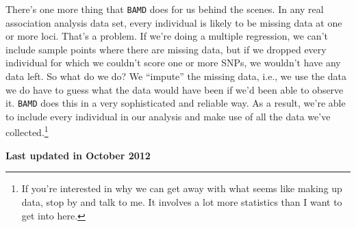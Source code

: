 There's one more thing that {\tt BAMD} does for us behind the
scenes. In any real association analysis data set, every individual is
likely to be missing data at one or more loci. That's a problem. If
we're doing a multiple regression, we can't include sample points
where there are missing data, but if we dropped every individual for
which we couldn't score one or more SNPs, we wouldn't have any data
left. So what do we do? We ``impute'' the missing data, i.e., we use
the data we do have to guess what the data would have been if we'd
been able to observe it. {\tt BAMD} does this in a very sophisticated
and reliable way. As a result, we're able to include every individual
in our analysis and make use of all the data we've
collected.\footnote{If you're interested in why we can get away with
  what seems like making up data, stop by and talk to me. It involves
  a lot more statistics than I want to get into here.}

{\bf Last updated in October 2012}